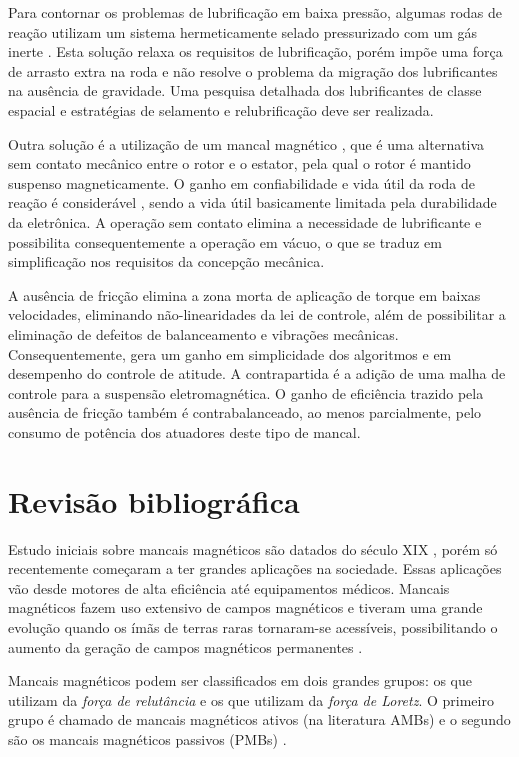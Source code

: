 Para contornar os problemas de lubrificação em baixa pressão, algumas rodas de reação  utilizam um sistema hermeticamente selado pressurizado com um gás inerte \citep{Krishnan2010}. Esta solução relaxa os requisitos de lubrificação, porém impõe uma força de arrasto extra na roda e não resolve o problema da migração dos lubrificantes na ausência de gravidade. Uma pesquisa detalhada dos lubrificantes de classe espacial e estratégias de selamento e relubrificação deve ser realizada.

Outra solução é a utilização de um mancal magnético \citep{Bangcheng2012}, que é uma alternativa sem contato mecânico entre o rotor e o estator, pela qual o rotor é mantido suspenso magneticamente. O ganho em confiabilidade e vida útil da roda de reação é considerável \citep{Marble2006}, sendo a vida útil basicamente limitada  pela durabilidade da eletrônica. A operação sem contato elimina a necessidade de lubrificante e possibilita consequentemente a operação em vácuo, o que se traduz em simplificação nos requisitos da concepção mecânica. 

A ausência de fricção elimina a zona morta de aplicação de torque em baixas velocidades, eliminando não-linearidades da lei de controle, além de possibilitar a eliminação de defeitos de balanceamento e vibrações mecânicas. Consequentemente, gera um ganho em simplicidade dos algoritmos e em desempenho do controle de atitude. A contrapartida é a adição de uma malha de controle para a suspensão eletromagnética. O ganho de eficiência trazido pela ausência de fricção também é contrabalanceado, ao menos parcialmente, pelo consumo de potência dos atuadores deste tipo de mancal.


\section{Revisão bibliográfica}


Estudo iniciais sobre mancais magnéticos são datados do século XIX \citep{Weise1989}, porém só recentemente começaram a ter grandes aplicações na sociedade. Essas aplicações vão desde motores de alta eficiência até equipamentos médicos. Mancais magnéticos fazem uso extensivo de campos magnéticos e tiveram uma grande evolução quando os ímãs de terras raras tornaram-se acessíveis, possibilitando o aumento da geração de campos magnéticos permanentes \cite{Furlani2001}.

Mancais magnéticos podem ser classificados em dois grandes grupos: os que utilizam da \textit{força de relutância} e os que utilizam da \textit{força de Loretz}. O primeiro grupo é chamado de mancais magnéticos ativos (na literatura AMBs) e o segundo são os mancais magnéticos passivos (PMBs) \cite{Schweitzer2009}.


